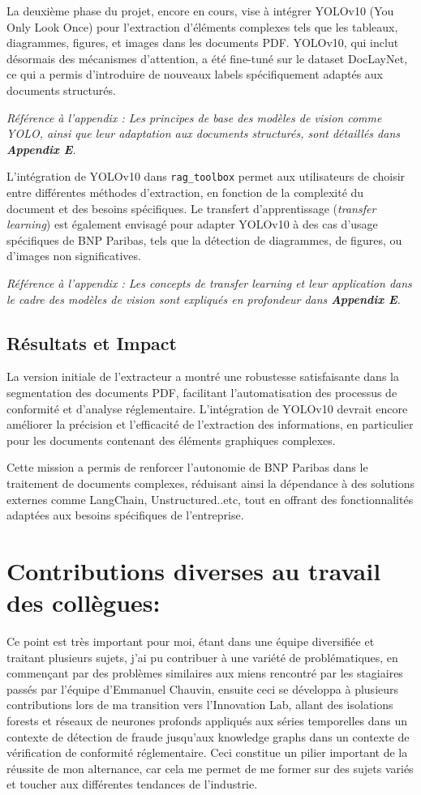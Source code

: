 \documentclass[13pt,a4paper]{article}
\begin{document}
La deuxième phase du projet, encore en cours, vise à intégrer YOLOv10 (You Only Look Once) pour l'extraction d'éléments complexes tels que les tableaux, diagrammes, figures, et images dans les documents PDF. YOLOv10, qui inclut désormais des mécanismes d'attention, a été fine-tuné sur le dataset DocLayNet, ce qui a permis d'introduire de nouveaux labels spécifiquement adaptés aux documents structurés.

\textit{Référence à l'appendix : Les principes de base des modèles de vision comme YOLO, ainsi que leur adaptation aux documents structurés, sont détaillés dans \textbf{Appendix E}.}

L'intégration de YOLOv10 dans \texttt{rag\_toolbox} permet aux utilisateurs de choisir entre différentes méthodes d'extraction, en fonction de la complexité du document et des besoins spécifiques. Le transfert d'apprentissage (\textit{transfer learning}) est également envisagé pour adapter YOLOv10 à des cas d'usage spécifiques de BNP Paribas, tels que la détection de diagrammes, de figures, ou d'images non significatives.

\textit{Référence à l'appendix : Les concepts de \textit{transfer learning} et leur application dans le cadre des modèles de vision sont expliqués en profondeur dans \textbf{Appendix E}.}

\subsection{Résultats et Impact}

La version initiale de l'extracteur a montré une robustesse satisfaisante dans la segmentation des documents PDF, facilitant l'automatisation des processus de conformité et d'analyse réglementaire. L'intégration de YOLOv10 devrait encore améliorer la précision et l'efficacité de l'extraction des informations, en particulier pour les documents contenant des éléments graphiques complexes.

Cette mission a permis de renforcer l'autonomie de BNP Paribas dans le traitement de documents complexes, réduisant ainsi la dépendance à des solutions externes comme LangChain, Unstructured..etc, tout en offrant des fonctionnalités adaptées aux besoins spécifiques de l'entreprise.

\section{ Contributions diverses au travail des collègues:}
Ce point est très important pour moi, étant dans une équipe diversifiée et traitant plusieurs sujets, j'ai pu contribuer à une variété de problématiques, en commençant par des problèmes similaires aux miens rencontré par les stagiaires passés par l'équipe d'Emmanuel Chauvin, ensuite ceci se développa à plusieurs contributions lors de ma transition vers l'Innovation Lab, allant des isolations forests et réseaux de neurones profonds appliqués aux séries temporelles dans un contexte de détection de fraude jusqu'aux knowledge graphs dans un contexte de vérification de conformité réglementaire. Ceci constitue un pilier important de la réussite de mon alternance, car cela me permet de me former sur des sujets variés et toucher aux différentes tendances de l'industrie.
\end{document}
